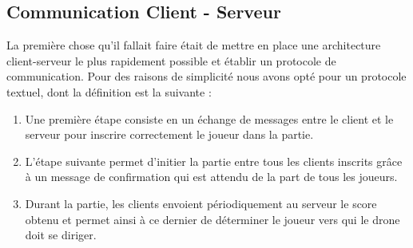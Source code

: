 \subsection{Communication Client - Serveur}

La première chose qu'il fallait faire était de mettre en place une architecture client-serveur le plus rapidement possible et établir un protocole de communication. Pour des raisons de simplicité nous avons opté pour un protocole textuel, dont la définition est la suivante :
\begin{enumerate}
\item Une première étape consiste en un échange de messages entre le client et le serveur pour inscrire correctement le joueur dans la partie.
\item L'étape suivante permet d'initier la partie entre tous les clients inscrits grâce à un message de confirmation qui est attendu de la part de tous les joueurs.
\item Durant la partie, les clients envoient périodiquement au serveur le score obtenu et permet ainsi à ce dernier de déterminer le joueur vers qui le drone doit se diriger.
\end{enumerate}